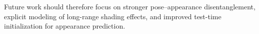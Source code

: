 \documentclass[runningheads]{llncs}
\begin{document}
Future work should therefore focus on stronger pose--appearance disentanglement, explicit modeling of long-range shading effects, and improved test-time initialization for appearance prediction.



\end{document}
